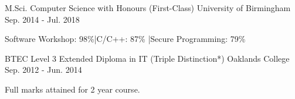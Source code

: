 

\begin{cventries}

  \cventry
  {M.Sci. Computer Science with Honours (First-Class)} %
    {University of Birmingham} %
    {} %
    {Sep. 2014 - Jul. 2018} %
    {
      \begin{cvitems}
      \item {Software Workshop: 98\%\hspace*{3mm}|\hspace*{3mm}C/C++: 87\%
        \hspace*{3mm}|\hspace*{3mm}Secure Programming: 79\%}
      \end{cvitems}
    }

  \cventry
  {BTEC Level 3 Extended Diploma in IT (Triple Distinction*)} %
    {Oaklands College} %
    {} %
    {Sep. 2012 - Jun. 2014} %
    {
      \begin{cvitems} %
        \item {Full marks attained for 2 year course.}
      \end{cvitems}
    }

\end{cventries}

